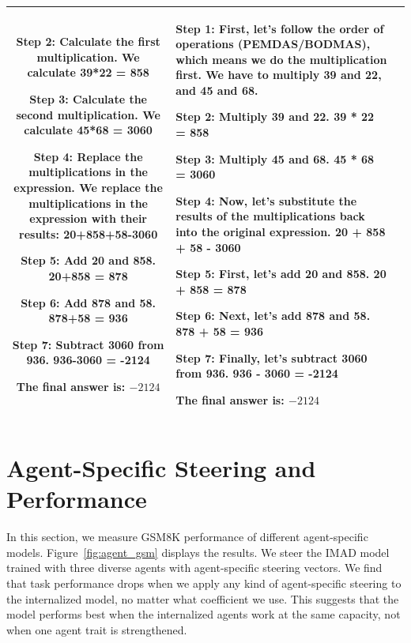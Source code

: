 \begin{table}[t]
\begin{tabularx}{\textwidth}{c|X|X}
\textbf{Step 2:} Calculate the first multiplication. We calculate 39*22 = 858

\textbf{Step 3:} Calculate the second multiplication. We calculate 45*68 = 3060

\textbf{Step 4:} Replace the multiplications in the expression. We replace the multiplications in the expression with their results: 20+858+58-3060

\textbf{Step 5:} Add 20 and 858. 20+858 = 878

\textbf{Step 6:} Add 878 and 58. 878+58 = 936

\textbf{Step 7:} Subtract 3060 from 936. 936-3060 = -2124

The final answer is: $\boxed{-2124}$
& 
\textbf{Step 1:} First, let's follow the order of operations (PEMDAS/BODMAS), which means we do the multiplication first. We have to multiply 39 and 22, and 45 and 68.

\textbf{Step 2:} Multiply 39 and 22. 39 * 22 = 858

\textbf{Step 3:} Multiply 45 and 68. 45 * 68 = 3060

\textbf{Step 4:} Now, let's substitute the results of the multiplications back into the original expression. 20 + 858 + 58 - 3060

\textbf{Step 5:} First, let's add 20 and 858. 20 + 858 = 878

\textbf{Step 6:} Next, let's add 878 and 58. 878 + 58 = 936

\textbf{Step 7:} Finally, let's subtract 3060 from 936. 936 - 3060 = -2124

The final answer is: $\boxed{-2124}$
\\
\hline
\end{tabularx}
\end{table}

\section{Agent-Specific Steering and Performance}
In this section, we measure GSM8K performance of different agent-specific models. Figure~\ref{fig:agent_gsm} displays the results. We steer the IMAD model trained with three diverse agents with agent-specific steering vectors. 
We find that task performance drops when we apply any kind of agent-specific steering to the internalized model, no matter what coefficient we use.
This suggests that the model performs best when the internalized agents work at the same capacity, not when one agent trait is strengthened. 

